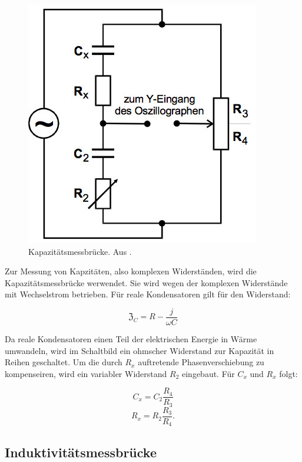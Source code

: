 \begin{figure}
  \centering
  \includegraphics[scale=0.5]{content/kapazitätsbrücke.jpg}
  \caption{Kapazitätsmessbrücke. Aus \cite{anleitung302}.}
  \label{fig:kapazität}
\end{figure}

Zur Messung von Kapzitäten, also komplexen Widerständen, wird die Kapazitätsmessbrücke werwendet. Sie wird wegen der komplexen Widerstände mit Wechselstrom betrieben.
Für reale Kondensatoren gilt für den Widerstand:

\begin{equation}
  \mathfrak{Z}_C = R - \frac{j}{\omega C}
\end{equation}

Da reale Kondensatoren einen Teil der elektrischen Energie in Wärme umwandeln, wird im Schaltbild ein ohmscher Widerstand zur Kapazität in Reihen geschaltet.
Um die durch $R_x$ auftretende Phasenverschiebung zu kompenseiren, wird ein variabler Widerstand $R_{2}$ eingebaut. Für $C_x$ und $R_x$ folgt:

\begin{equation}
  C_x = C_{2} \frac{R_4}{R_3}
\end{equation}
\begin{equation}
  R_x = R_{2} \frac{R_3}{R_4}.
\end{equation}

\subsection{Induktivitätsmessbrücke}

